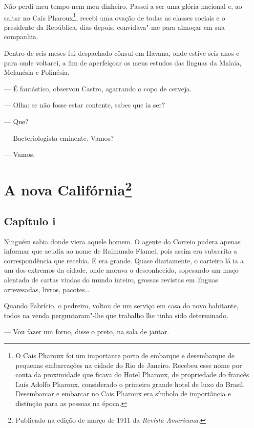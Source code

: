 Não perdi meu tempo nem meu dinheiro. Passei a ser uma glória nacional
e, ao saltar no Cais Pharoux\footnote{O Cais Pharoux foi um importante
  porto de embarque e desembarque de pequenas embarcações na cidade do
  Rio de Janeiro. Recebeu esse nome por conta da proximidade que ficava
  do Hotel Pharoux, de propriedade do francês Luís Adolfo Pharoux,
  considerado o primeiro grande hotel de luxo do Brasil. Desembarcar e
  embarcar no Cais Pharoux era símbolo de importância e distinção para
  as pessoas na época.}, recebi uma ovação de todas as classes sociais e
o presidente da República, dias depois, convidava"-me para almoçar em sua
companhia.

Dentro de seis meses fui despachado cônsul em Havana, onde estive seis
anos e para onde voltarei, a fim de aperfeiçoar os meus estudos das
línguas da Malaia, Melanésia e Polinésia.

--- É fantástico, observou Castro, agarrando o copo de cerveja.

--- Olha: se não fosse estar contente, sabes que ia ser?

--- Que?

--- Bacteriologista eminente. Vamos?

--- Vamos.



\chapter[A nova Califórnia]{A nova Califórnia\footnote[*]{Publicado na edição de março de 1911 da \emph{Revista Americana}.}}

\section*{Capítulo i}

\noindent{}Ninguém sabia donde viera aquele homem. O agente do Correio pudera
apenas informar que acudia ao nome de Raimundo Flamel, pois assim era
subscrita a correspondência que recebia. E era grande. Quase
diariamente, o carteiro lá ia a um dos extremos da cidade, onde morava o
desconhecido, sopesando um maço alentado de cartas vindas do mundo
inteiro, grossas revistas em línguas arrevesadas, livros, pacotes\ldots{}

Quando Fabrício, o pedreiro, voltou de um serviço em casa do novo
habitante, todos na venda perguntaram"-lhe que trabalho lhe tinha sido
determinado.

--- Vou fazer um forno, disse o preto, na sala de jantar.

